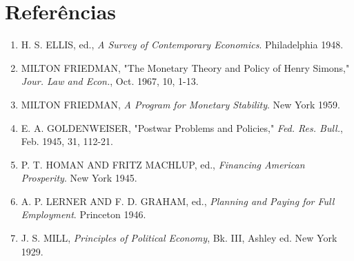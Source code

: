 \documentclass[12pt]{article}
\begin{document}
\section*{Referências}

\begin{enumerate}
    \item H. S. ELLIS, ed., \textit{A Survey of Contemporary Economics}. Philadelphia 1948.
    \item MILTON FRIEDMAN, "The Monetary Theory and Policy of Henry Simons," \textit{Jour. Law and Econ.}, Oct. 1967, 10, 1-13.
    \item MILTON FRIEDMAN, \textit{A Program for Monetary Stability}. New York 1959.
    \item E. A. GOLDENWEISER, "Postwar Problems and Policies," \textit{Fed. Res. Bull.}, Feb. 1945, 31, 112-21.
    \item P. T. HOMAN AND FRITZ MACHLUP, ed., \textit{Financing American Prosperity}. New York 1945.
    \item A. P. LERNER AND F. D. GRAHAM, ed., \textit{Planning and Paying for Full Employment}. Princeton 1946.
    \item J. S. MILL, \textit{Principles of Political Economy}, Bk. III, Ashley ed. New York 1929.
\end{enumerate}
\end{document}
